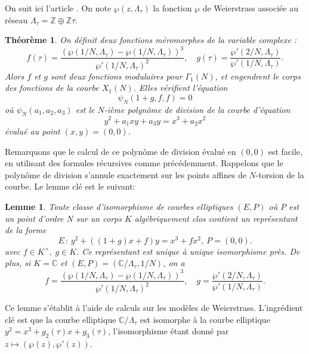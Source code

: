 \documentclass[11pt,a4paper]{article}
\newcommand{\Z}{\mathbb{Z}}
\newcommand{\C}{\mathbb{C}}
\newcommand{\de}{\,:\,}
\newtheorem*{thm}{Théorème}
\newtheorem*{lem}{Lemme}
\theoremstyle{definition}
\begin{document}
On suit ici l'article \cite{Baaziz}. On note $\wp(z, \Lambda_\tau)$ la fonction $\wp$ de Weierstrass associée au réseau $\Lambda_\tau = \Z\oplus\Z \tau.$

\begin{thm}
On définit deux fonctions méromorphes de la variable complexe :
$$f(\tau) = \frac{(\wp(1/N, \Lambda_\tau) - \wp(1/N, \Lambda_\tau))^3}{\wp'(1/N, \Lambda_\tau)^2}, \quad
g(\tau) = \frac{\wp'(2/N, \Lambda_\tau)}{\wp'(1/N,\Lambda_\tau)}.$$
Alors $f$ et $g$ sont deux fonctions modulaires pour $\Gamma_1(N)$, et engendrent le corps des fonctions de la courbe $X_1(N)$. Elles vérifient l'équation
$$\psi_N(1+g, f, f) = 0$$
où $\psi_N(a_1, a_2, a_3)$ est le $N$-ième polynôme de division de la courbe d'équation
$$y^2 + a_1xy + a_3y = x^3 + a_2x^2$$
évalué au point $(x, y) = (0, 0)$.
\end{thm}

Remarquons que le calcul de ce polynôme de division évalué en $(0, 0)$ est facile, en utilisant des formules récursives comme précédemment. Rappelons que le polynôme de division s'annule exactement sur les points affines de $N$-torsion de la courbe. Le lemme clé est le suivant:

\begin{lem}
Toute classe d'isomorphisme de courbes elliptiques $(E, P)$ où $P$ est un point d'ordre $N$ sur un corps $K$ algébriquement clos contient un représentant de la forme
$$E\de y^2 + ((1+g) x + f)y = x^3 + fx^2,\ P = (0,0).$$
avec $f\in K^\times,\ g\in K$. Ce représentant est unique à unique isomorphisme près.
De plus, si $K=\C$ et $(E, P) = (\C/\Lambda_\tau, 1/N)$, on a
$$f = \frac{(\wp(1/N, \Lambda_\tau) - \wp(1/N, \Lambda_\tau))^3}{\wp'(1/N, \Lambda_\tau)^2}, \quad  g = \frac{\wp'(2/N, \Lambda_\tau)}{\wp'(1/N,\Lambda_\tau)}.$$
\end{lem}
Ce lemme s'établit à l'aide de calculs sur les modèles de Weierstrass. L'ingrédient clé est que la courbe elliptique $\C/\Lambda_\tau$ est isomorphe à la courbe elliptique $y^2 = x^3 + g_2(\tau) x + g_3(\tau)$, l'isomorphisme étant donné par 
$z\mapsto (\wp(z), \wp'(z))$.
\end{document}
